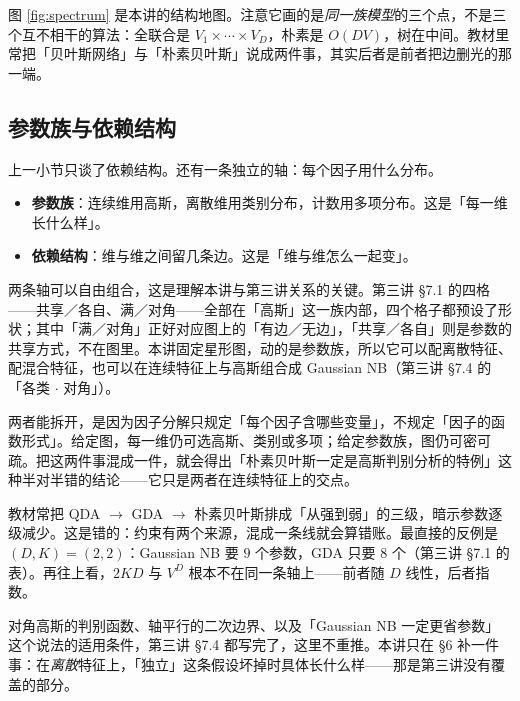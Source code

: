 \documentclass[11pt,a4paper,fontset=windows,zihao=-4]{ctexart}
\begin{document}
图 \ref{fig:spectrum} 是本讲的结构地图。注意它画的是\emph{同一族模型}的三个点，不是三个互不相干的算法：全联合是 $V_1\times\cdots\times V_D$，朴素是 $O(DV)$，树在中间。教材里常把「贝叶斯网络」与「朴素贝叶斯」说成两件事，其实后者是前者把边删光的那一端。

\subsection{参数族与依赖结构}

上一小节只谈了依赖结构。还有一条独立的轴：每个因子用什么分布。

\begin{itemize}
  \item \textbf{参数族}：连续维用高斯，离散维用类别分布，计数用多项分布。这是「每一维长什么样」。
  \item \textbf{依赖结构}：维与维之间留几条边。这是「维与维怎么一起变」。
\end{itemize}

两条轴可以自由组合，这是理解本讲与第三讲关系的关键。第三讲 §7.1 的四格——共享／各自、满／对角——全部在「高斯」这一族内部，四个格子都预设了形状；其中「满／对角」正好对应图上的「有边／无边」，「共享／各自」则是参数的共享方式，不在图里。本讲固定星形图，动的是参数族，所以它可以配离散特征、配混合特征，也可以在连续特征上与高斯组合成 Gaussian NB（第三讲 §7.4 的「各类 $\cdot$ 对角」）。

两者能拆开，是因为因子分解只规定「每个因子含哪些变量」，不规定「因子的函数形式」。给定图，每一维仍可选高斯、类别或多项；给定参数族，图仍可密可疏。把这两件事混成一件，就会得出「朴素贝叶斯一定是高斯判别分析的特例」这种半对半错的结论——它只是两者在连续特征上的交点。

\begin{keybox}[两条约束不能并成一条阶梯]
教材常把 QDA $\to$ GDA $\to$ 朴素贝叶斯排成「从强到弱」的三级，暗示参数逐级减少。这是错的：约束有两个来源，混成一条线就会算错账。最直接的反例是 $(D,K)=(2,2)$：Gaussian NB 要 $9$ 个参数，GDA 只要 $8$ 个（第三讲 §7.1 的表）。再往上看，$2KD$ 与 $V^D$ 根本不在同一条轴上——前者随 $D$ 线性，后者指数。
\end{keybox}

\begin{add}
对角高斯的判别函数、轴平行的二次边界、以及「Gaussian NB 一定更省参数」这个说法的适用条件，第三讲 §7.4 都写完了，这里不重推。本讲只在 §6 补一件事：在\emph{离散}特征上，「独立」这条假设坏掉时具体长什么样——那是第三讲没有覆盖的部分。
\end{add}
\end{document}
